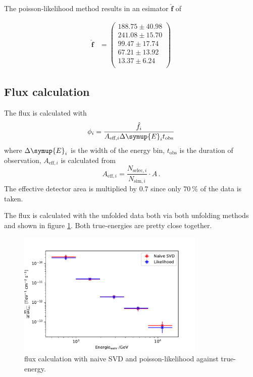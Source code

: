 The poisson-likelihood method results in an esimator $\hat{\symbf{f}}$ of

\begin{align}
\hat{\symbf{f}} &=
\begin{pmatrix}
     188.75 \pm 40.98 \\
     241.08 \pm 15.70 \\
     99.47 \pm 17.74 \\
     67.21 \pm 13.92 \\
     13.37 \pm 6.24 \\
\end{pmatrix}
\end{align}

\subsection{Flux calculation}

The flux is calculated with
\begin{equation}
  \phi_i = \frac{\hat{f}_i}{A_{\text{eff}, i} \Delta\symup{E}_i t_\text{obs}}
  \label{eqn:flux}
\end{equation}
where $\Delta\symup{E}_i$ is the width of the energy bin, $t_\text{obs}$ is the duration of observation, $A_{\text{eff}, i}$ is calculated from
\begin{equation}
  A_{\text{eff}, i} = \frac{N_{\text{selec}, i}}{N_{\text{sim}, i}} \cdot A\,.
\end{equation}
The effective detector area is multiplied by $0.7$ since only $\SI{70}{\percent}$ of the data is taken.

The flux is calculated with the unfolded data both via both unfolding methods and shown in figure \ref{fig:fluxBoth}.
Both true-energies are pretty close together.

\begin{figure}[H]
  \centering
  \includegraphics[width=0.8\textwidth]{plots/Fluss.pdf}
  \caption{flux calculation with naive SVD and poisson-likelihood against true-energy.}
  \label{fig:fluxBoth}
\end{figure}

